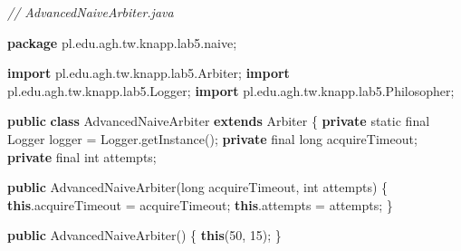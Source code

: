 \documentclass[11pt]{article}
\newenvironment{Shaded}{}{}
\newcommand{\KeywordTok}[1]{\textcolor[rgb]{0.00,0.44,0.13}{\textbf{{#1}}}}
\newcommand{\DataTypeTok}[1]{\textcolor[rgb]{0.56,0.13,0.00}{{#1}}}
\newcommand{\DecValTok}[1]{\textcolor[rgb]{0.25,0.63,0.44}{{#1}}}
\newcommand{\CommentTok}[1]{\textcolor[rgb]{0.38,0.63,0.69}{\textit{{#1}}}}
\newcommand{\FunctionTok}[1]{\textcolor[rgb]{0.02,0.16,0.49}{{#1}}}
\newcommand{\NormalTok}[1]{{#1}}
\newcommand{\ImportTok}[1]{{#1}}
\newcommand{\OperatorTok}[1]{\textcolor[rgb]{0.40,0.40,0.40}{{#1}}}
\newcommand{\BuiltInTok}[1]{{#1}}
\begin{document}
\begin{Shaded}
\begin{Highlighting}[]
\CommentTok{// AdvancedNaiveArbiter.java}

\KeywordTok{package}\ImportTok{ pl}\OperatorTok{.}\ImportTok{edu}\OperatorTok{.}\ImportTok{agh}\OperatorTok{.}\ImportTok{tw}\OperatorTok{.}\ImportTok{knapp}\OperatorTok{.}\ImportTok{lab5}\OperatorTok{.}\ImportTok{naive}\OperatorTok{;}

\KeywordTok{import} \ImportTok{pl}\OperatorTok{.}\ImportTok{edu}\OperatorTok{.}\ImportTok{agh}\OperatorTok{.}\ImportTok{tw}\OperatorTok{.}\ImportTok{knapp}\OperatorTok{.}\ImportTok{lab5}\OperatorTok{.}\ImportTok{Arbiter}\OperatorTok{;}
\KeywordTok{import} \ImportTok{pl}\OperatorTok{.}\ImportTok{edu}\OperatorTok{.}\ImportTok{agh}\OperatorTok{.}\ImportTok{tw}\OperatorTok{.}\ImportTok{knapp}\OperatorTok{.}\ImportTok{lab5}\OperatorTok{.}\ImportTok{Logger}\OperatorTok{;}
\KeywordTok{import} \ImportTok{pl}\OperatorTok{.}\ImportTok{edu}\OperatorTok{.}\ImportTok{agh}\OperatorTok{.}\ImportTok{tw}\OperatorTok{.}\ImportTok{knapp}\OperatorTok{.}\ImportTok{lab5}\OperatorTok{.}\ImportTok{Philosopher}\OperatorTok{;}

\KeywordTok{public} \KeywordTok{class}\NormalTok{ AdvancedNaiveArbiter }\KeywordTok{extends}\NormalTok{ Arbiter }\OperatorTok{\{}
    \KeywordTok{private} \DataTypeTok{static} \DataTypeTok{final} \BuiltInTok{Logger}\NormalTok{ logger }\OperatorTok{=} \BuiltInTok{Logger}\OperatorTok{.}\FunctionTok{getInstance}\OperatorTok{();}
    \KeywordTok{private} \DataTypeTok{final} \DataTypeTok{long}\NormalTok{ acquireTimeout}\OperatorTok{;}
    \KeywordTok{private} \DataTypeTok{final} \DataTypeTok{int}\NormalTok{ attempts}\OperatorTok{;}

    \KeywordTok{public} \FunctionTok{AdvancedNaiveArbiter}\OperatorTok{(}\DataTypeTok{long}\NormalTok{ acquireTimeout}\OperatorTok{,} \DataTypeTok{int}\NormalTok{ attempts}\OperatorTok{)} \OperatorTok{\{}
        \KeywordTok{this}\OperatorTok{.}\FunctionTok{acquireTimeout} \OperatorTok{=}\NormalTok{ acquireTimeout}\OperatorTok{;}
        \KeywordTok{this}\OperatorTok{.}\FunctionTok{attempts} \OperatorTok{=}\NormalTok{ attempts}\OperatorTok{;}
    \OperatorTok{\}}

    \KeywordTok{public} \FunctionTok{AdvancedNaiveArbiter}\OperatorTok{()} \OperatorTok{\{}
        \KeywordTok{this}\OperatorTok{(}\DecValTok{50}\OperatorTok{,} \DecValTok{15}\OperatorTok{);}
    \OperatorTok{\}}


\end{Highlighting}
\end{Shaded}
\end{document}
